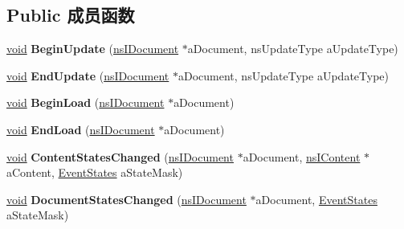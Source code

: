 \subsection*{Public 成员函数}
\begin{DoxyCompactItemize}
\item 
\mbox{\label{interfacens_i_document_observer_aa2db8e82b965c6e6b18e89124695a267}} 
\hyperlink{interfacevoid}{void} {\bfseries Begin\+Update} (\hyperlink{interfacens_i_document}{ns\+I\+Document} $\ast$a\+Document, ns\+Update\+Type a\+Update\+Type)
\item 
\mbox{\label{interfacens_i_document_observer_acb29eb00d92641fb23994c1cdf7fa4d9}} 
\hyperlink{interfacevoid}{void} {\bfseries End\+Update} (\hyperlink{interfacens_i_document}{ns\+I\+Document} $\ast$a\+Document, ns\+Update\+Type a\+Update\+Type)
\item 
\mbox{\label{interfacens_i_document_observer_a3528542ce76a25dbb1067badbb4eacbe}} 
\hyperlink{interfacevoid}{void} {\bfseries Begin\+Load} (\hyperlink{interfacens_i_document}{ns\+I\+Document} $\ast$a\+Document)
\item 
\mbox{\label{interfacens_i_document_observer_a0fce632c608c91aac03e8921968f72d1}} 
\hyperlink{interfacevoid}{void} {\bfseries End\+Load} (\hyperlink{interfacens_i_document}{ns\+I\+Document} $\ast$a\+Document)
\item 
\mbox{\label{interfacens_i_document_observer_ab7a9cb48ba683868d340d77eab440746}} 
\hyperlink{interfacevoid}{void} {\bfseries Content\+States\+Changed} (\hyperlink{interfacens_i_document}{ns\+I\+Document} $\ast$a\+Document, \hyperlink{interfacens_i_content}{ns\+I\+Content} $\ast$a\+Content, \hyperlink{structns_i_document_observer_1_1_event_states}{Event\+States} a\+State\+Mask)
\item 
\mbox{\label{interfacens_i_document_observer_a191f4842032bce6197e0eb375ff12806}} 
\hyperlink{interfacevoid}{void} {\bfseries Document\+States\+Changed} (\hyperlink{interfacens_i_document}{ns\+I\+Document} $\ast$a\+Document, \hyperlink{structns_i_document_observer_1_1_event_states}{Event\+States} a\+State\+Mask)

\end{DoxyCompactItemize}
